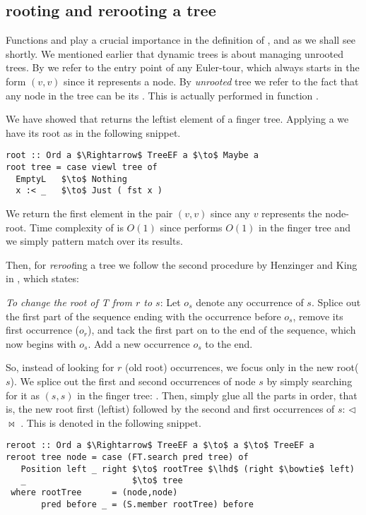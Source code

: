 \subsection{rooting and rerooting a tree}
Functions \root and \reroot play a crucial importance in the definition of \link, \cut and \conn as we shall see shortly. We mentioned earlier that dynamic trees is about managing unrooted trees. By \root we refer to the entry point of any Euler-tour, which always starts in the form $(v,v)$ since it represents a node. By \emph{unrooted} tree we refer to the fact that any node in the tree can be its \root. This is actually performed in function \link.

We have showed that  returns the leftist element of a finger tree. Applying  a  we have its root as in the following snippet.
\begin{lstlisting}[mathescape] 
root :: Ord a $\Rightarrow$ TreeEF a $\to$ Maybe a  
root tree = case viewl tree of
  EmptyL   $\to$ Nothing
  x :< _   $\to$ Just ( fst x )
\end{lstlisting}

We return the first element in the pair $(v,v)$ since any $v$ represents the node-root. Time complexity of \root is $O(1)$ since  performs $O(1)$ in the finger tree and we simply pattern match over its results.

Then, for \textit{reroot}ing a tree we follow the second procedure by Henzinger and King in \cite{Rand-DynGs-Algos}, which states:
\begin{displayquote}
\emph{To change the root of \textit{T} from $r$ to $s$}: Let $o_s$ denote any occurrence of $s$. Splice out the first part of the sequence ending with the occurrence before $o_s$, remove its first occurrence ($o_r$), and tack the first part on to the end of the sequence, which now begins with $o_s$. Add a new occurrence $o_s$ to the end.
\end{displayquote}

So, instead of looking for $r$ (old root) occurrences, we focus only in the new root($s$). We splice out the first and second occurrences of node $s$ by simply searching for it as $(s,s)$ in the finger tree: . Then, simply glue all the parts in order, that is, the new root first (leftist) followed by the second and first occurrences of $s$:  $\lhd$  $\bowtie$ . This is denoted in the following snippet.

\begin{lstlisting}[mathescape] 
reroot :: Ord a $\Rightarrow$ TreeEF a $\to$ a $\to$ TreeEF a 
reroot tree node = case (FT.search pred tree) of
   Position left _ right $\to$ rootTree $\lhd$ (right $\bowtie$ left)
   _                     $\to$ tree
 where rootTree      = (node,node)
       pred before _ = (S.member rootTree) before
\end{lstlisting} 

